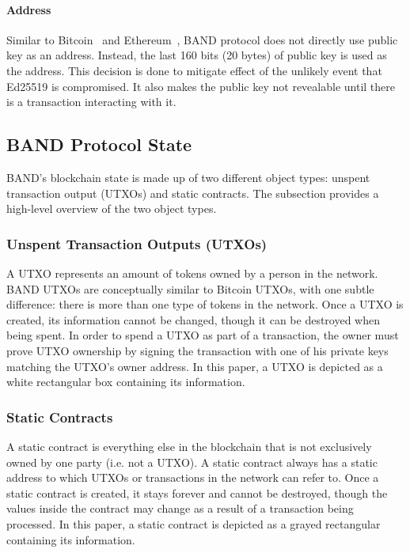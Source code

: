 \documentclass[letterpaper,11pt]{article}
\begin{document}
\paragraph{Address} Similar to Bitcoin~\cite{nakamoto} and Ethereum~\cite{wood2014ethereum}, BAND protocol does not directly use public key as an address. Instead, the last 160 bits (20 bytes) of public key is used as the address. This decision is done to mitigate effect of the unlikely event that Ed25519 is compromised. It also makes the public key not revealable until there is a transaction interacting with it.

\subsection{BAND Protocol State}
BAND's blockchain state is made up of two different object types: unspent transaction output (UTXOs) and static contracts. The subsection provides a high-level overview of the two object types.

\subsubsection{Unspent Transaction Outputs (UTXOs)}
A UTXO represents an amount of tokens owned by a person in the network. BAND UTXOs are conceptually similar to Bitcoin UTXOs, with one subtle difference: there is more than one type of tokens in the network. Once a UTXO is created, its information cannot be changed, though it can be destroyed when being spent. In order to spend a UTXO as part of a transaction, the owner must prove UTXO ownership by signing the transaction with one of his private keys matching the UTXO's owner address. In this paper, a UTXO is depicted as a white rectangular box containing its information.

\subsubsection{Static Contracts}
A static contract is everything else in the blockchain that is not exclusively owned by one party (i.e. not a UTXO). A static contract always has a static address to which UTXOs or transactions in the network can refer to. Once a static contract is created, it stays forever and cannot be destroyed, though the values inside the contract may change as a result of a transaction being processed. In this paper, a static contract is depicted as a grayed rectangular containing its information.
\end{document}
